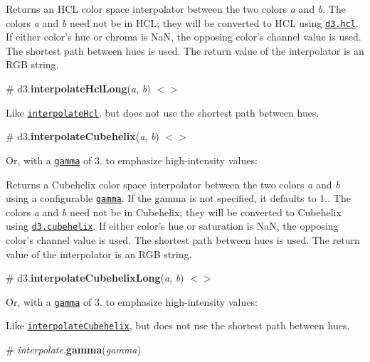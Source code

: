Returns an H\+CL color space interpolator between the two colors {\itshape a} and {\itshape b}. The colors {\itshape a} and {\itshape b} need not be in H\+CL; they will be converted to H\+CL using \href{https://github.com/d3/d3-color#hcl}{\tt d3.\+hcl}. If either color’s hue or chroma is NaN, the opposing color’s channel value is used. The shortest path between hues is used. The return value of the interpolator is an R\+GB string.

\label{_interpolateHclLong}%
\# d3.{\bfseries interpolate\+Hcl\+Long}({\itshape a}, {\itshape b}) \href{https://github.com/d3/d3-interpolate/blob/master/src/hcl.js#L21}{\tt $<$$>$}



Like \href{#interpolateHcl}{\tt interpolate\+Hcl}, but does not use the shortest path between hues.

\label{_interpolateCubehelix}%
\# d3.{\bfseries interpolate\+Cubehelix}({\itshape a}, {\itshape b}) \href{https://github.com/d3/d3-interpolate/blob/master/src/cubehelix.js}{\tt $<$$>$}



Or, with a \href{#interpolate_gamma}{\tt gamma} of 3. to emphasize high-\/intensity values\+:



Returns a Cubehelix color space interpolator between the two colors {\itshape a} and {\itshape b} using a configurable \href{#interpolate_gamma}{\tt gamma}. If the gamma is not specified, it defaults to 1.. The colors {\itshape a} and {\itshape b} need not be in Cubehelix; they will be converted to Cubehelix using \href{https://github.com/d3/d3-color#cubehelix}{\tt d3.\+cubehelix}. If either color’s hue or saturation is NaN, the opposing color’s channel value is used. The shortest path between hues is used. The return value of the interpolator is an R\+GB string.

\label{_interpolateCubehelixLong}%
\# d3.{\bfseries interpolate\+Cubehelix\+Long}({\itshape a}, {\itshape b}) \href{https://github.com/d3/d3-interpolate/blob/master/src/cubehelix.js#L29}{\tt $<$$>$}



Or, with a \href{#interpolate_gamma}{\tt gamma} of 3. to emphasize high-\/intensity values\+:



Like \href{#interpolateCubehelix}{\tt interpolate\+Cubehelix}, but does not use the shortest path between hues.

\label{_interpolate_gamma}%
\# {\itshape interpolate}.{\bfseries gamma}({\itshape gamma})

